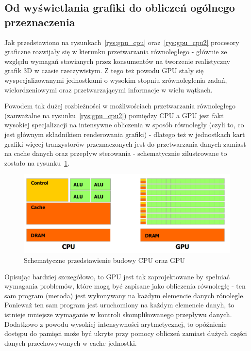 \subsection{Od wyświetlania grafiki do obliczeń ogólnego przeznaczenia}
Jak przedstawiono na rysunkach~\ref{rys:gpu_cpu} oraz~\ref{rys:gpu_cpu2} procesory graficzne rozwijały się w kierunku przetwarzania równoległego - głównie ze względu wymagań stawianych przez konsumentów na tworzenie realistyczny grafik 3D w czasie rzeczywistym. Z tego też powodu GPU stały się wyspecjalizowanymi jednostkami o wysokim stopniu zrównoleglenia zadań, wielordzeniowymi oraz przetwarzającymi informacje w wielu wątkach. 

Powodem tak dużej rozbieżności w możliwościach przetwarzania równoległego (zauważalne na rysunku~\ref{rys:gpu_cpu2}) pomiędzy CPU a GPU jest fakt wysokiej specjalizacji na intensywne obliczenia w sposób równoległy (czyli to, co jest głównym składnikiem renderowania grafiki) - dlatego też w jednostkach kart grafiki więcej tranzystorów przeznaczonych jest do przetwarzania danych zamiast na cache danych oraz przepływ sterowania - schematycznie zilustrowane to zostało na rysunku~\ref{rys:gpu_cpu_trans}.

\begin{figure}[ht]
\centering\includegraphics[width=1.0\textwidth]{figures/03/gpu_cpu_trans.png}
\caption{Schematyczne przedstawienie budowy CPU oraz GPU~\cite{Cuda:PGuide}}\label{rys:gpu_cpu_trans}
\end{figure}

Opisując bardziej szczegółowo, to GPU jest tak zaprojektowane by spełniać wymagania problemów, które mogą być zapisane jako obliczenia równoległę - ten sam program (metoda) jest wykonywany na każdym elemencie danych rónolegle. Ponieważ ten sam program jest uruchomiony na każdym elemencie danyh, to istnieje mniejsze wymaganie w kontroli skomplikowanego przepływu danych. Dodatkowo z powodu wysokiej intensywności arytmetycznej, to opóźnienie dostępu do pamięci może być ukryte przy pomocy obliczeń zamiast dużych części danych przechowywanych w cache jednostki.

